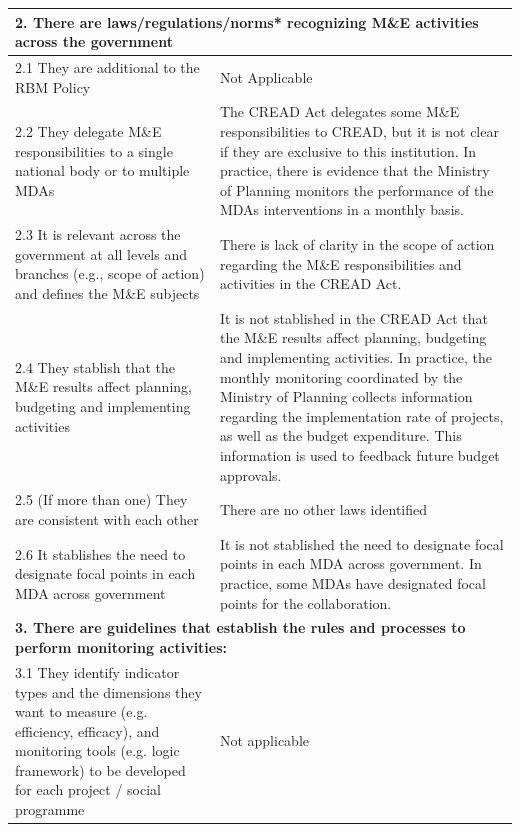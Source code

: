 \documentclass[
  10pt,
]{book}
\begin{document}
\begin{table}
\begin{tabular}[t]{l|l}
\hline
\multicolumn{2}{l}{\textbf{2. There are laws/regulations/norms* recognizing M\&E activities across the government}}\\
\hline
\hspace{1em}2.1 They are additional to the RBM Policy & Not Applicable\\
\hline
\hspace{1em}2.2 They delegate M\&E responsibilities to a single national body or to multiple MDAs & The CREAD Act delegates some M\&E responsibilities to CREAD, but it is not clear if they are exclusive to this institution. In practice, there is evidence that the Ministry of Planning monitors the performance of the MDAs interventions in a monthly basis.\\
\hline
\hspace{1em}2.3 It is relevant across the government at all levels and branches (e.g., scope of action) and defines the M\&E subjects & There is lack of clarity in the scope of action regarding the M\&E responsibilities and activities in the CREAD Act.\\
\hline
\hspace{1em}2.4 They stablish that the M\&E results affect planning, budgeting and implementing activities & It is not stablished in the CREAD Act that the M\&E results affect planning, budgeting and implementing activities. In practice, the monthly monitoring coordinated by the Ministry of Planning collects information regarding the implementation rate of projects, as well as the budget expenditure. This information is used to feedback future budget approvals.\\
\hline
\hspace{1em}2.5 (If more than one) They are consistent with each other & There are no other laws identified\\
\hline
\hspace{1em}2.6 It stablishes the need to designate focal points in each MDA across government & It is not stablished the need to designate focal points in each MDA across government. In practice, some MDAs have designated focal points for the collaboration.\\
\hline
\multicolumn{2}{l}{\textbf{3. There are guidelines that establish the rules and processes to perform monitoring activities:}}\\
\hline
\hspace{1em}3.1 They identify indicator types and the dimensions they want to measure (e.g. efficiency, efficacy), and monitoring tools (e.g. logic framework) to be developed for each project / social programme & Not applicable\\

\end{tabular}
\end{table}
\end{document}
